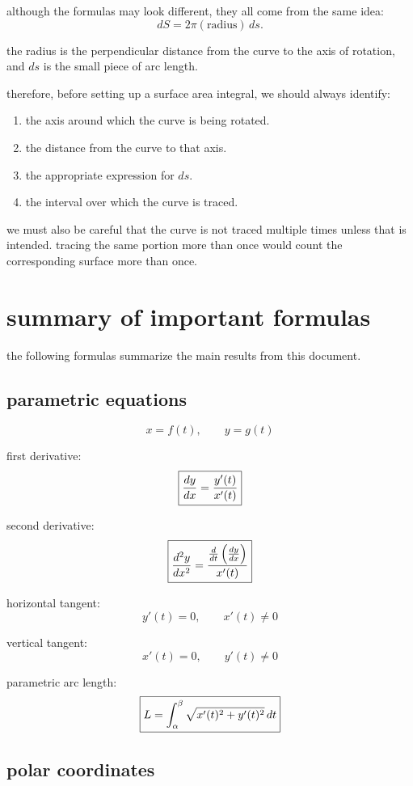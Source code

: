 \documentclass{article}
\newcommand{\mybox}[1]{\fbox{\ensuremath{\displaystyle #1}}}
\begin{document}
although the formulas may look different, they all come from the same idea:
\[
dS=2\pi(\mathrm{radius})\,ds.
\]

the radius is the perpendicular distance from the curve to the axis of rotation, and $ds$ is the small piece of arc length.

therefore, before setting up a surface area integral, we should always identify:

\begin{enumerate}
\item the axis around which the curve is being rotated.
\item the distance from the curve to that axis.
\item the appropriate expression for $ds$.
\item the interval over which the curve is traced.
\end{enumerate}

we must also be careful that the curve is not traced multiple times unless that is intended. tracing the same portion more than once would count the corresponding surface more than once.\\

\newpage

\section{summary of important formulas}

the following formulas summarize the main results from this document.

\subsection{parametric equations}

\[
x=f(t),\qquad y=g(t)
\]

first derivative:
\[
\mybox{
\frac{dy}{dx}=\frac{y'(t)}{x'(t)}
}
\]

second derivative:
\[
\mybox{
\frac{d^2y}{dx^2}
=
\frac{
\frac{d}{dt}\left(\frac{dy}{dx}\right)
}{
x'(t)
}
}
\]

horizontal tangent:
\[
y'(t)=0,\qquad x'(t)\neq0
\]

vertical tangent:
\[
x'(t)=0,\qquad y'(t)\neq0
\]

parametric arc length:
\[
\mybox{
L=\int_\alpha^\beta
\sqrt{x'(t)^2+y'(t)^2}\,dt
}
\]

\subsection{polar coordinates}
\end{document}
